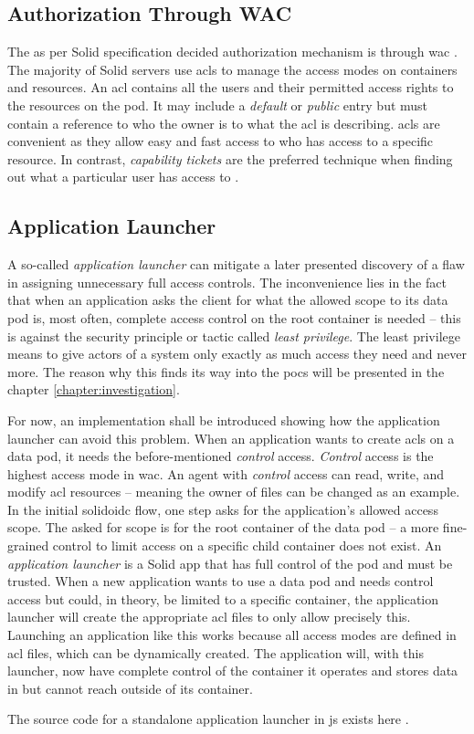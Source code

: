 \subsection{Authorization Through WAC}

The as per Solid specification decided authorization mechanism is through \gls{wac} \cite{wac}. The majority of Solid servers use \glspl{acl} to manage the access modes on containers and resources. An \gls{acl} contains all the users and their permitted access rights to the resources on the pod. It may include a \textit{default} or \textit{public} entry but must contain a reference to who the owner is to what the \gls{acl} is describing. \glspl{acl} are convenient as they allow easy and fast access to who has access to a specific resource. In contrast, \textit{capability tickets} are the preferred technique when finding out what a particular user has access to \cite{stallings}.

\subsection{Application Launcher}

A so-called \textit{application launcher} can mitigate a later presented discovery of a flaw in assigning unnecessary full access controls. The inconvenience lies in the fact that when an application asks the client for what the allowed scope to its data pod is, most often, complete access control on the root container is needed -- this is against the security principle or tactic called \textit{least privilege}. The least privilege means to give actors of a system only exactly as much access they need and never more. The reason why this finds its way into the \glspl{poc} will be presented in the chapter \ref{chapter:investigation}.

For now, an implementation shall be introduced showing how the application launcher can avoid this problem. When an application wants to create \glspl{acl} on a data pod, it needs the before-mentioned \textit{control} access. \textit{Control} access is the highest access mode in \gls{wac}. An agent with \textit{control} access can read, write, and modify \gls{acl} resources -- meaning the owner of files can be changed as an example.
In the initial \gls{solidoidc} flow, one step asks for the application's allowed access scope. The asked for scope is for the root container of the data pod -- a more fine-grained control to limit access on a specific child container does not exist. An \textit{application launcher} is a Solid app that has full control of the pod and must be trusted. When a new application wants to use a data pod and needs control access but could, in theory, be limited to a specific container, the application launcher will create the appropriate \gls{acl} files to only allow precisely this.
Launching an application like this works because all access modes are defined in \gls{acl} files, which can be dynamically created. The application will, with this launcher, now have complete control of the container it operates and stores data in but cannot reach outside of its container.

The source code for a standalone application launcher in \gls{js} exists here \cite{app-launcher}.
